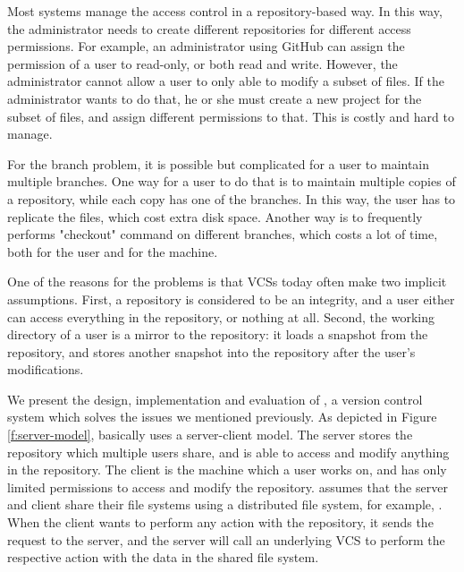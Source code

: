 Most systems manage the access control in a repository-based way. In this way,
the administrator needs to create different repositories for different access
permissions. For example, an administrator using GitHub\cite{github} can assign
the permission of a user to read-only, or both read and write. However, the
administrator cannot allow a user to only able to modify a subset of files. If
the administrator wants to do that, he or she must create a new project for the
subset of files, and assign different permissions to that. This is costly and
hard to manage.

For the branch problem, it is possible but complicated for a user to maintain
multiple branches. One way for a user to do that is to maintain multiple copies
of a repository, while each copy has one of the branches. In this way, the user
has to replicate the files, which cost extra disk space. Another way is to
frequently performs "checkout" command on different branches, which costs a lot
of time, both for the user and for the machine.

One of the reasons for the problems is that VCSs today often
make two implicit assumptions. First, a repository is considered to be
an integrity, and a user either can access everything in the repository, or
nothing at all. Second, the working directory of a user is a mirror to the
repository: it loads a snapshot from the repository, and stores another snapshot
into the repository after the user's modifications. 




We present the design, implementation and evaluation of \sys, a version control
system which solves the issues we mentioned previously. As depicted in Figure
\ref{f:server-model}, \sys basically
uses a server-client model. The server stores the repository which multiple
users share, and is able to access and modify anything in the
repository. The client is the machine which a user works on, and has only
limited permissions to access and modify the repository. \sys assumes that the
server and client share their file systems using a distributed file system, for
example,
\nfs. %
When the client wants to perform any action with the repository, it sends the
request to the server, and the server will call an underlying VCS to perform
the respective action with the data in the shared file system.

